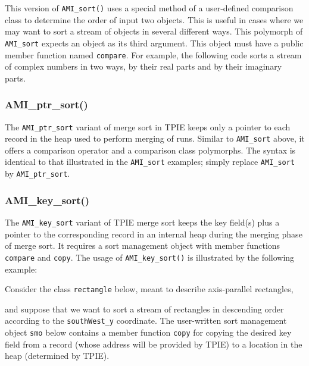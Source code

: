 This version of \lstinline|AMI_sort()| uses a special method of a
user-defined comparison class to determine the order of input two
objects. This is useful in cases where we may want to sort a stream of
objects in several different ways. This polymorph of
\lstinline|AMI_sort| expects an object as its third argument. This
object must have a public member function named \lstinline|compare|.
For example, the following code sorts a stream of complex numbers in
two ways, by their real parts and by their imaginary
parts.




\subsubsection{AMI\_ptr\_sort()}

The \lstinline|AMI_ptr_sort| variant of merge sort in TPIE keeps only
a pointer to each record in the heap used to perform merging of runs.
Similar to \lstinline|AMI_sort| above, it offers a comparison operator
and a comparison class polymorphs. The syntax is identical to that
illustrated in the \lstinline|AMI_sort| examples; simply replace
\lstinline|AMI_sort| by \lstinline|AMI_ptr_sort|.

\subsubsection{AMI\_key\_sort()}

The \lstinline|AMI_key_sort| variant of TPIE merge sort keeps the key
field(s) plus a pointer to the corresponding record in an internal
heap during the merging phase of merge sort.  It requires a sort
management object with member functions \lstinline|compare| and
\lstinline|copy|. The usage of \lstinline|AMI_key_sort()| is
illustrated by the following example:

Consider the class \lstinline|rectangle| below, meant to describe
axis-parallel rectangles,



\noindent
and suppose that we want to sort a stream of rectangles in descending
order according to the \lstinline|southWest_y| coordinate. The
user-written sort management object \lstinline|smo| below contains a
member function \lstinline|copy| for copying the desired key field
from a record (whose address will be provided by TPIE) to a location
in the heap (determined by TPIE).


